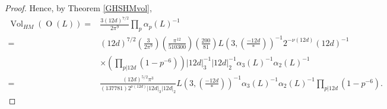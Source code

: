\documentclass[12pt, a4paper]{article}
\newcommand{\opn}{\operatorname}
\begin{document}
\begin{proof}
  Hence, by Theorem \ref{GHSHMvol}, 
  \begin{align*}
    \opn{Vol}_{HM}(\opn{O}(L))
    = &  \frac{3 (12d)^{7/2} }{2 \pi^9}  \prod_p \alpha_p(L)^{-1} \\
    = & (12d)^{7/2} \left ( \frac{3}{2 \pi^9} \right )
    \left (\frac{\pi^{12}}{510300} \right )
    \left ( \frac{200}{81} \right ) L(3, \left( \frac{-12d}{*} \right) )^{-1} 2^{-\nu(12d)} (12d)^{-1} \\
    &  \times \left( \prod_{p \vert 12 d} (1-p^{-6}) \right )
    \vert 12 d \vert^{-1}_3 \vert 12d \vert^{-1}_2 \alpha_3(L)^{-1} \alpha_2(L)^{-1} \\
    = & \frac{(12d)^{5/2}\pi^{3}}{(137781)  2^{\nu(12d)} \vert 12 d \vert_3 \vert 12d \vert_2} L(3, \left( \frac{-12d}{*} \right) )^{-1} \alpha_3(L)^{-1} \alpha_2(L)^{-1} \prod_{p \vert 12 d} (1-p^{-6}).
  \end{align*}
\end{proof}
\end{document}
